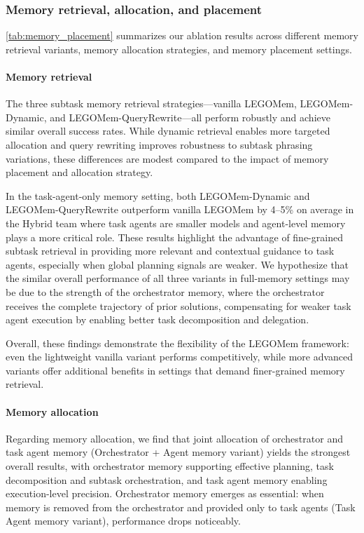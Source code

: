 \documentclass[sigconf]{aamas}
\newcommand{\legomem}{LEGOMem}
\newcommand{\dynalegomem}{LEGOMem-Dynamic}
\newcommand{\queryrewritelegomem}{LEGOMem-QueryRewrite}
\begin{document}
\subsubsection{Memory retrieval, allocation, and placement}
\autoref{tab:memory_placement} summarizes our ablation results across different memory retrieval variants, memory allocation strategies, and memory placement settings.

\paragraph{Memory retrieval} The three subtask memory retrieval strategies—vanilla \legomem{}, \dynalegomem{}, and \queryrewritelegomem{}—all perform robustly and achieve similar overall success rates. While dynamic retrieval enables more targeted allocation and query rewriting improves robustness to subtask phrasing variations, these differences are modest compared to the impact of memory placement and allocation strategy.

In the task-agent-only memory setting, both \dynalegomem{} and \queryrewritelegomem{} outperform vanilla \legomem{} by 4–5\% on average in the Hybrid team where task agents are smaller models and agent-level memory plays a more critical role. These results highlight the advantage of fine-grained subtask retrieval in providing more relevant and contextual guidance to task agents, especially when global planning signals are weaker. We hypothesize that the similar overall performance of all three variants in full-memory settings may be due to the strength of the orchestrator memory, where the orchestrator receives the complete trajectory of prior solutions, compensating for weaker task agent execution by enabling better task decomposition and delegation. 

Overall, these findings demonstrate the flexibility of the \legomem{} framework: even the lightweight vanilla variant performs competitively, while more advanced variants offer additional benefits in settings that demand finer-grained memory retrieval.

\paragraph{Memory allocation} Regarding memory allocation, we find that joint allocation of orchestrator and task agent memory (Orchestrator + Agent memory variant) yields the strongest overall results, with orchestrator memory supporting effective planning, task decomposition and subtask orchestration, and task agent memory enabling execution-level precision. Orchestrator memory emerges as essential: when memory is removed from the orchestrator and provided only to task agents (Task Agent memory variant), performance drops noticeably.
\end{document}

